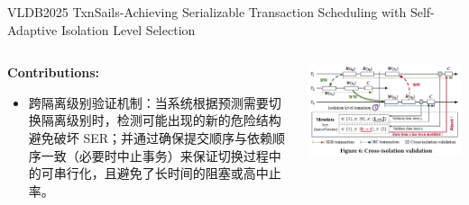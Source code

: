 \begin{frame}{VLDB2025 TxnSails-Achieving Serializable Transaction Scheduling with Self-Adaptive Isolation Level Selection}
	\begin{columns}
		\begin{column}{0.5\textwidth}
			\textbf{Contributions: }
			\begin{itemize}
				\item 跨隔离级别验证机制：当系统根据预测需要切换隔离级别时，检测可能出现的新的危险结构避免破坏 SER；并通过确保提交顺序与依赖顺序一致（必要时中止事务）来保证切换过程中的可串行化，且避免了长时间的阻塞或高中止率。
			\end{itemize}
		\end{column}
		\begin{column}{0.5\textwidth}
			\includegraphics[width=0.98\linewidth]{figs/TxnSails-cross-isolation}
		\end{column}
	\end{columns}
\end{frame}
